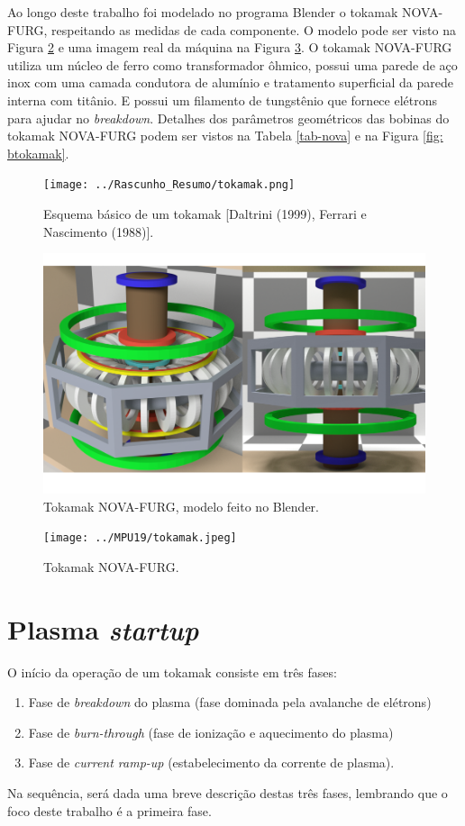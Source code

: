 \documentclass[12pt,oneside,a4paper]{abntex2}
\begin{document}
Ao longo deste trabalho foi modelado no programa Blender o tokamak NOVA-FURG, respeitando as medidas de cada componente. O modelo pode ser visto na Figura \ref{fig: Rotulotokamak001} e uma imagem real da máquina na Figura \ref{fig: Rotulotokamak003}. 
O tokamak NOVA-FURG utiliza um núcleo de ferro como transformador ôhmico, possui uma parede de aço inox com uma camada condutora de alumínio e tratamento superficial da parede interna com titânio. E possui um filamento de tungstênio que fornece elétrons para ajudar no \textit{breakdown}.  
Detalhes dos parâmetros geométricos das bobinas do tokamak NOVA-FURG podem ser vistos na Tabela \ref{tab-nova} e na Figura \ref{fig: btokamak}. 
\begin{figure}[H]
\centering
\texttt{[image: ../Rascunho\_Resumo/tokamak.png]} 
\caption{Esquema básico de um tokamak [Daltrini (1999), Ferrari e Nascimento (1988)].}
\label{fig: Rotulotokamak01}  
\end{figure}
\begin{figure}[H]
\centering
\includegraphics[scale=0.45]{tokamak12.png}
\caption{Tokamak NOVA-FURG, modelo feito no Blender.}    
\label{fig: Rotulotokamak001}
\end{figure}
\begin{figure}[H]
\centering
\texttt{[image: ../MPU19/tokamak.jpeg]} 
\caption{Tokamak NOVA-FURG.}    
\label{fig: Rotulotokamak003}
\end{figure}
\section{Plasma \textit{startup}}
O início da operação de um tokamak consiste em três fases:
\begin{enumerate}
\item Fase de \textit{breakdown} do plasma (fase dominada pela avalanche de elétrons)
\item Fase de \textit{burn-through} (fase de ionização e aquecimento do plasma) 
\item Fase de \textit{current ramp-up} (estabelecimento da corrente de plasma).
\end{enumerate}
Na sequência, será dada uma breve descrição destas três fases, lembrando que o foco deste trabalho é a primeira fase. 
\end{document}
